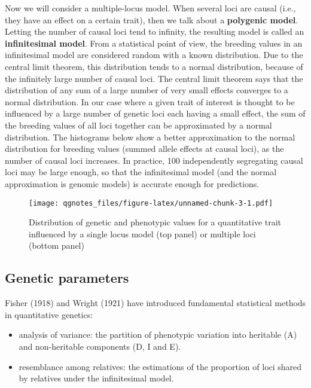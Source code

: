 \documentclass[
]{book}
\providecommand{\tightlist}{%
  \setlength{\itemsep}{0pt}\setlength{\parskip}{0pt}}
\begin{document}
Now we will consider a multiple-locus model. When several loci are causal (i.e., they have an effect on a certain trait), then we talk about a \textbf{polygenic model}. Letting the number of causal loci tend to infinity, the resulting model is called an \textbf{infinitesimal model}. From a statistical point of view, the breeding values in an infinitesimal model are considered random with a known distribution. Due to the central limit theorem, this distribution tends to a normal distribution, because of the infinitely large number of causal loci. The central limit theorem says that the distribution of any sum of a large number of very small effects converges to a normal distribution. In our case where a given trait of interest is thought to be influenced by a large number of genetic loci each having a small effect, the sum of the breeding values of all loci together can be approximated by a normal distribution. The histograms below show a better approximation to the normal distribution for breeding values (summed allele effects at causal loci), as the number of causal loci increases. In practice, 100 independently segregating causal loci may be large enough, so that the infinitesimal model (and the normal approximation is genomic models) is accurate enough for predictions.

\begin{figure}
\centering
\texttt{[image: qgnotes\_files/figure-latex/unnamed-chunk-3-1.pdf]}
\caption{\label{fig:unnamed-chunk-3}Distribution of genetic and phenotypic values for a quantitative trait influenced by a single locus model (top panel) or multiple loci (bottom panel)}
\end{figure}

\hypertarget{genetic-parameters}{%
\subsection{Genetic parameters}\label{genetic-parameters}}

Fisher (1918) and Wright (1921) have introduced fundamental statistical methods in quantitative genetics:

\begin{itemize}
\tightlist
\item
  analysis of variance: the partition of phenotypic variation into heritable (A) and non-heritable components (D, I and E).
\item
  resemblance among relatives: the estimations of the proportion of loci shared by relatives under the infinitesimal model.
\end{itemize}
\end{document}
